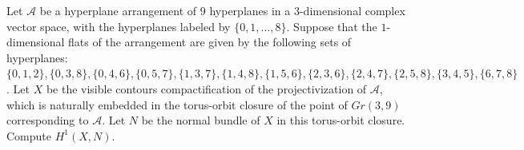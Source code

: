 Let $\mathcal{A}$ be a hyperplane arrangement of $9$ hyperplanes in a $3$-dimensional complex vector space, with the hyperplanes labeled by $\{0, 1, \dotsc, 8\}$. Suppose that the $1$-dimensional flats of the arrangement are given by the following sets of hyperplanes: $\{0, 1, 2\}, \{0, 3,8\},\{0, 4, 6\},\{0, 5, 7\},\{1, 3, 7\},\{1, 4, 8\},\{1, 5, 6\},\{2, 3, 6\},\{2, 4, 7\},\{2, 5, 8\},\{3, 4, 5\}, \{6, 7, 8\}$. Let $X$ be the visible contours compactification of the projectivization of $\mathcal{A}$, which is naturally embedded in the torus-orbit closure of the point of $Gr(3,9)$ corresponding to $\mathcal{A}$. Let $N$ be the normal bundle of $X$ in this torus-orbit closure. Compute $H^1(X, N)$.
